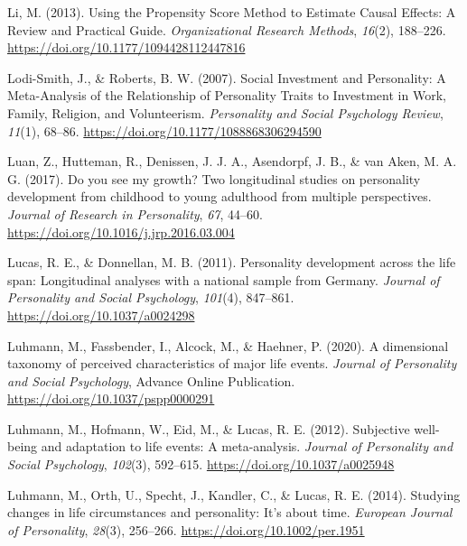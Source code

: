 \documentclass[
  english,
  man, noextraspace]{apa7}
\begin{document}
\leavevmode\hypertarget{ref-liUsingPropensityScore2013}{}%
Li, M. (2013). Using the Propensity Score Method to Estimate Causal Effects: A Review and Practical Guide. \emph{Organizational Research Methods}, \emph{16}(2), 188--226. \url{https://doi.org/10.1177/1094428112447816}

\leavevmode\hypertarget{ref-lodi-smithSocialInvestmentPersonality2007}{}%
Lodi-Smith, J., \& Roberts, B. W. (2007). Social Investment and Personality: A Meta-Analysis of the Relationship of Personality Traits to Investment in Work, Family, Religion, and Volunteerism. \emph{Personality and Social Psychology Review}, \emph{11}(1), 68--86. \url{https://doi.org/10.1177/1088868306294590}

\leavevmode\hypertarget{ref-luanYouSeeMy2017}{}%
Luan, Z., Hutteman, R., Denissen, J. J. A., Asendorpf, J. B., \& van Aken, M. A. G. (2017). Do you see my growth? Two longitudinal studies on personality development from childhood to young adulthood from multiple perspectives. \emph{Journal of Research in Personality}, \emph{67}, 44--60. \url{https://doi.org/10.1016/j.jrp.2016.03.004}

\leavevmode\hypertarget{ref-lucasPersonalityDevelopmentLife2011}{}%
Lucas, R. E., \& Donnellan, M. B. (2011). Personality development across the life span: Longitudinal analyses with a national sample from Germany. \emph{Journal of Personality and Social Psychology}, \emph{101}(4), 847--861. \url{https://doi.org/10.1037/a0024298}

\leavevmode\hypertarget{ref-luhmannDimensionalTaxonomyPerceived2020}{}%
Luhmann, M., Fassbender, I., Alcock, M., \& Haehner, P. (2020). A dimensional taxonomy of perceived characteristics of major life events. \emph{Journal of Personality and Social Psychology}, Advance Online Publication. \url{https://doi.org/10.1037/pspp0000291}

\leavevmode\hypertarget{ref-luhmannSubjectiveWellbeingAdaptation2012}{}%
Luhmann, M., Hofmann, W., Eid, M., \& Lucas, R. E. (2012). Subjective well-being and adaptation to life events: A meta-analysis. \emph{Journal of Personality and Social Psychology}, \emph{102}(3), 592--615. \url{https://doi.org/10.1037/a0025948}

\leavevmode\hypertarget{ref-luhmannStudyingChangesLife2014}{}%
Luhmann, M., Orth, U., Specht, J., Kandler, C., \& Lucas, R. E. (2014). Studying changes in life circumstances and personality: It's about time. \emph{European Journal of Personality}, \emph{28}(3), 256--266. \url{https://doi.org/10.1002/per.1951}
\end{document}
